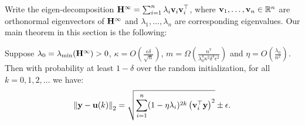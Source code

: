 Write the eigen-decomposition $\mathbf{H}^\infty = \sum_{i=1}^n \lambda_i \mathbf{v}_i \mathbf{v}_i^\top$, where $\mathbf{v}_1, \ldots, \mathbf{v}_n \in \mathbb{R}^n$ are orthonormal eigenvectors of $\mathbf{H}^\infty$ and $\lambda_1, \ldots, \lambda_n$ are corresponding eigenvalues.
Our main theorem in this section is the following:
\begin{thm}\label{thm:convergence_rate}
Suppose $\lambda_0 = \lambda_{\min}(\mathbf{H}^\infty) >0$,
$\kappa = O\left( \frac{\epsilon \delta}{\sqrt n} \right)$,
 $m = \Omega\left( \frac{n^7}{\lambda_0^4 \kappa^2 \delta^4 \epsilon^2} \right)$ and $\eta = O\left( \frac{\lambda_0}{n^2} \right)$. 
Then with probability at least $1-\delta$ over the random initialization, for all $k=0, 1, 2, \ldots$ we have: 
\begin{equation} \label{eqn:u(k)-y_size}
\left\|\mathbf{y}-\mathbf{u}(k)\right\|_2
= \sqrt{\sum_{i=1}^{n}(1-\eta\lambda_i)^{2k} \left(\mathbf{v}_i^\top \mathbf{y}\right)^2} \pm \epsilon.
\end{equation}
\end{thm}

